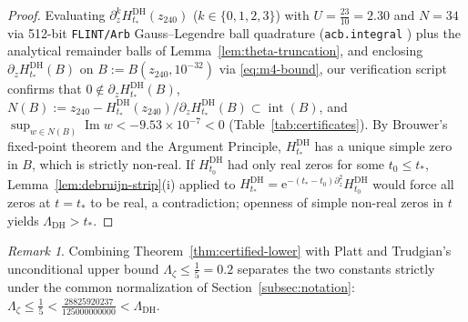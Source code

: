 \documentclass[11pt,a4paper,reqno]{amsart}
\theoremstyle{definition}
\theoremstyle{remark}
\newtheorem{remark}[theorem]{Remark}
\numberwithin{equation}{section}
\newcommand{\ee}{\mathrm{e}}
\DeclareMathOperator{\Imop}{Im}
\begin{document}
\begin{proof}
Evaluating $\partial_z^k H_{t_*}^{\mathrm{DH}}(z_{240})$ ($k \in \{0, 1, 2, 3\}$) with $U = \frac{23}{10} = 2.30$ and $N = 34$ via 512-bit \texttt{FLINT/Arb} Gauss--Legendre ball quadrature (\texttt{acb.integral} \cite{johansson2017}) plus the analytical remainder balls of Lemma~\ref{lem:theta-truncation}, and enclosing $\partial_z H_{t_*}^{\mathrm{DH}}(B)$ on $B := B(z_{240}, 10^{-32})$ via \eqref{eq:m4-bound}, our verification script confirms that $0 \notin \partial_z H_{t_*}^{\mathrm{DH}}(B)$, $N(B) := z_{240} - H_{t_*}^{\mathrm{DH}}(z_{240})/\partial_z H_{t_*}^{\mathrm{DH}}(B) \subset \operatorname{int}(B)$, and $\sup_{w \in N(B)}\Imop w < -9.53 \times 10^{-7} < 0$ (Table~\ref{tab:certificates}). By Brouwer's fixed-point theorem and the Argument Principle, $H_{t_*}^{\mathrm{DH}}$ has a unique simple zero in $B$, which is strictly non-real. If $H_{t_0}^{\mathrm{DH}}$ had only real zeros for some $t_0 \le t_*$, Lemma~\ref{lem:debruijn-strip}(i) applied to $H_{t_*}^{\mathrm{DH}} = \ee^{-(t_* - t_0)\partial_z^2}H_{t_0}^{\mathrm{DH}}$ would force all zeros at $t = t_*$ to be real, a contradiction; openness of simple non-real zeros in $t$ yields $\Lambda_{\mathrm{DH}} > t_*$.
\end{proof}

\begin{remark}
\label{rem:platt-comparison}
Combining Theorem~\ref{thm:certified-lower} with Platt and Trudgian's unconditional upper bound $\Lambda_\zeta \le \frac{1}{5} = 0.2$ \cite{platt2021} separates the two constants strictly under the common normalization of Section~\ref{subsec:notation}: $\Lambda_\zeta \le \frac{1}{5} < \frac{28825920237}{125000000000} < \Lambda_{\mathrm{DH}}$.
\end{remark}
\end{document}
